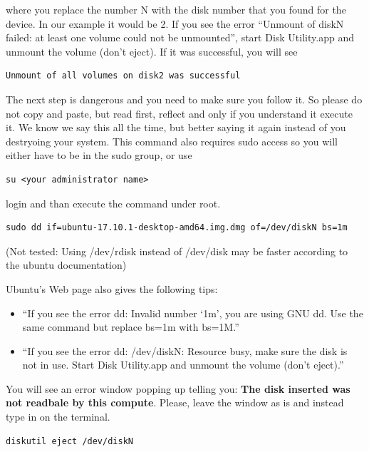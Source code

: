where you replace the number N with the disk number that you found for
the device. In our example it would be 2. If you see the error ``Unmount
of diskN failed: at least one volume could not be unmounted'', start
Disk Utility.app and unmount the volume (don't eject). If it was
successful, you will see

\begin{lstlisting}
Unmount of all volumes on disk2 was successful
\end{lstlisting}

The next step is dangerous and you need to make sure you follow it. So
please do not copy and paste, but read first, reflect and only if you
understand it execute it. We know we say this all the time, but better
saying it again instead of you destryoing your system. This command also
requires sudo access so you will either have to be in the sudo group, or
use

\begin{lstlisting}
su <your administrator name>
\end{lstlisting}

login and than execute the command under root.

\begin{lstlisting}
sudo dd if=ubuntu-17.10.1-desktop-amd64.img.dmg of=/dev/diskN bs=1m
\end{lstlisting}

(Not tested: Using /dev/rdisk instead of /dev/disk may be faster
according to the ubuntu documentation)

Ubuntu's Web page also gives the following tips:

\begin{itemize}
\item
  ``If you see the error dd: Invalid number `1m', you are using GNU dd.
  Use the same command but replace bs=1m with bs=1M.''
\item
  ``If you see the error dd: /dev/diskN: Resource busy, make sure the
  disk is not in use. Start Disk Utility.app and unmount the volume
  (don't eject).''
\end{itemize}

You will see an error window popping up telling you: \textbf{The disk
inserted was not readbale by this compute}. Please, leave the window as
is and instead type in on the terminal.

\begin{lstlisting}
diskutil eject /dev/diskN
\end{lstlisting}

